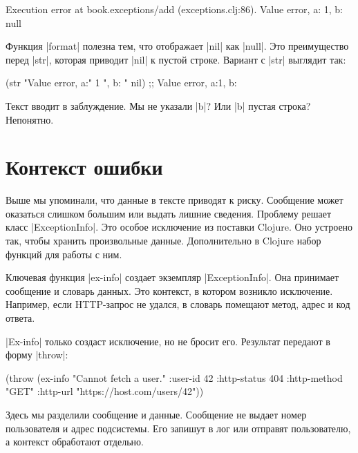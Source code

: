 \begin{english}
  \begin{clojure}
Execution error at book.exceptions/add (exceptions.clj:86).
Value error, a: 1, b: null
  \end{clojure}
\end{english}

Функция \spverb|format| полезна тем, что отображает \spverb|nil| как
\spverb|null|. Это преимущество перед \spverb|str|, которая приводит
\spverb|nil| к пустой строке. Вариант с \spverb|str| выглядит так:

\begin{english}
  \begin{clojure}
(str "Value error, a:" 1 ", b: " nil)
;; Value error, a:1, b:
  \end{clojure}
\end{english}

\noindent
Текст вводит в заблуждение. Мы не указали \spverb|b|? Или \spverb|b| пустая
строка? Непонятно.

\section{Контекст ошибки}

Выше мы упоминали, что данные в тексте приводят к риску. Сообщение может
оказаться слишком большим или выдать лишние сведения. Проблему решает класс
\spverb|ExceptionInfo|. Это особое исключение из поставки Clojure. Оно устроено
так, чтобы хранить произвольные данные. Дополнительно в Clojure набор функций
для работы с ним.

Ключевая функция \spverb|ex-info| создает экземпляр \spverb|ExceptionInfo|. Она
принимает сообщение и словарь данных. Это контекст, в котором возникло
исключение. Например, если HTTP-запрос не удался, в словарь помещают метод,
адрес и код ответа.

\spverb|Ex-info| только создаст исключение, но не бросит его. Результат передают
в форму \spverb|throw|:

\begin{english}
  \begin{clojure}
(throw (ex-info
        "Cannot fetch a user."
        {:user-id 42
         :http-status 404
         :http-method "GET"
         :http-url "https://host.com/users/42"}))
  \end{clojure}
\end{english}

Здесь мы разделили сообщение и данные. Сообщение не выдает номер пользователя и
адрес подсистемы. Его запишут в лог или отправят пользователю, а контекст
обработают отдельно.

